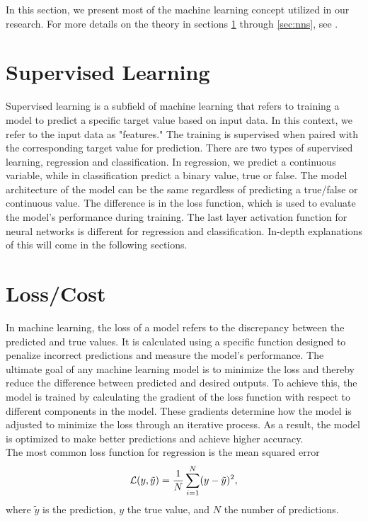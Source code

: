 In this section, we present most of the machine learning concept utilized in our research.
For more details on the theory in sections \ref{sec:supervised_learning} through \ref{sec:nns}, see \cite{Mehta2019}.

\section{Supervised Learning} \label{sec:supervised_learning}
Supervised learning is a subfield of machine learning that refers to training a model to predict a specific target value based on input data.
In this context, we refer to the input data as "features." The training is supervised when paired with the corresponding target value for prediction.
There are two types of supervised learning, regression and classification. 
In regression, we predict a continuous variable, while in classification predict a binary value, true or false.
The model architecture of the model can be the same regardless of predicting a true/false or continuous value. 
The difference is in the loss function, which is used to evaluate the model's performance during training. The last layer activation function for neural networks is different for regression and classification. 
In-depth explanations of this will come in the following sections.

\section{Loss/Cost} \label{sec:loss_cost}
In machine learning, the loss of a model refers to the discrepancy between the predicted and true values.
It is calculated using a specific function designed to penalize incorrect predictions and measure the model's performance.
The ultimate goal of any machine learning model is to minimize the loss and thereby reduce the difference between predicted and desired outputs.
To achieve this, the model is trained by calculating the gradient of the loss function with respect to different components in the model.
These gradients determine how the model is adjusted to minimize the loss through an iterative process.
As a result, the model is optimized to make better predictions and achieve higher accuracy.\\

The most common loss function for regression is the mean squared error
\begin{equation} \label{eq:mse}
    \mathcal{L}(y, \Tilde{y}) = \frac{1}{N}\sum_{i=1}^N(y-\Tilde{y})^2,
\end{equation}
where $\tilde{y}$ is the prediction, $y$ the true value, and $N$ the number of predictions.

